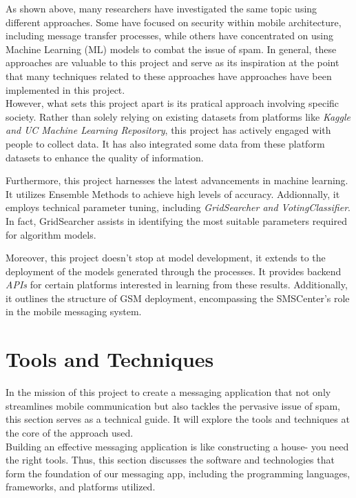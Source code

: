 \documentclass[12pt,a4paper]{report}
\begin{document}
	As shown above, many researchers have investigated the same topic using different approaches. Some have focused on security within mobile architecture, including message transfer processes, while others have concentrated on using Machine Learning (ML) models to combat the issue of spam. In general, these approaches are valuable to this project and serve as its inspiration at the point that many techniques related to these approaches have approaches have been implemented in this project.\\

    However, what sets this project apart is its pratical approach involving specific society. Rather than solely relying on existing datasets from platforms like \textit{Kaggle and UC Machine Learning Repository}, this project has actively engaged with people to collect data. It has also integrated some data from these platform datasets to enhance the quality of information. 
    
    Furthermore, this project harnesses the latest advancements in machine learning. It utilizes Ensemble Methods to achieve high levels of accuracy. Addionnally, it employs technical parameter tuning, including \textit{GridSearcher and VotingClassifier}. In fact, GridSearcher assists in identifying the most suitable parameters required for algorithm models.  
    
    Moreover, this project doesn't stop at model development, it extends to the deployment of the models generated through the processes. It provides backend \textit{APIs} for certain platforms interested in learning from these results. Additionally, it outlines the structure of GSM deployment, encompassing the SMSCenter's role in the mobile messaging system.
   
   
    
   \section{Tools and Techniques} 
	In the mission of this project to create a messaging application that not only streamlines mobile communication but also tackles the pervasive issue of spam, this section serves as a technical guide. It will explore the tools and techniques at the core of the approach used. \\
		
	Building an effective messaging application is like constructing a house- you need the right tools. Thus, this section discusses the software and technologies that form the foundation of our messaging app, including the programming languages, frameworks, and platforms utilized. \\
	
\end{document}
